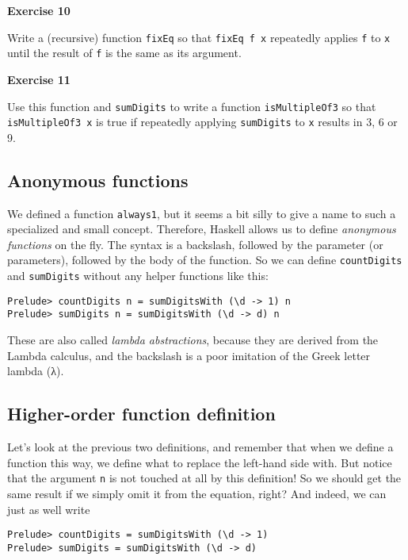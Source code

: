 \documentclass[11pt,
  american,
  DIV13]{article}
\begin{document}
\textbf{Exercise 10}

Write a (recursive) function \texttt{fixEq} so that \texttt{fixEq\ f\ x}
repeatedly applies \texttt{f} to \texttt{x} until the result of
\texttt{f} is the same as its argument.

\textbf{Exercise 11}

Use this function and \texttt{sumDigits} to write a function
\texttt{isMultipleOf3} so that \texttt{isMultipleOf3\ x} is true if
repeatedly applying \texttt{sumDigits} to \texttt{x} results in 3, 6 or
9.

\hypertarget{anonymous-functions}{%
\subsection{Anonymous functions}\label{anonymous-functions}}

We defined a function \texttt{always1}, but it seems a bit silly to give
a name to such a specialized and small concept. Therefore, Haskell
allows us to define \emph{anonymous functions} on the fly. The syntax is
a backslash, followed by the parameter (or parameters), followed by the
body of the function. So we can define \texttt{countDigits} and
\texttt{sumDigits} without any helper functions like this:

\begin{verbatim}
Prelude> countDigits n = sumDigitsWith (\d -> 1) n
Prelude> sumDigits n = sumDigitsWith (\d -> d) n
\end{verbatim}

These are also called \emph{lambda abstractions}, because they are
derived from the Lambda calculus, and the backslash is a poor imitation
of the Greek letter lambda (λ).

\hypertarget{higher-order-function-definition}{%
\subsection{Higher-order function
definition}\label{higher-order-function-definition}}

Let's look at the previous two definitions, and remember that when we
define a function this way, we define what to replace the left-hand side
with. But notice that the argument \texttt{n} is not touched at all by
this definition! So we should get the same result if we simply omit it
from the equation, right? And indeed, we can just as well write

\begin{verbatim}
Prelude> countDigits = sumDigitsWith (\d -> 1)
Prelude> sumDigits = sumDigitsWith (\d -> d)
\end{verbatim}
\end{document}
